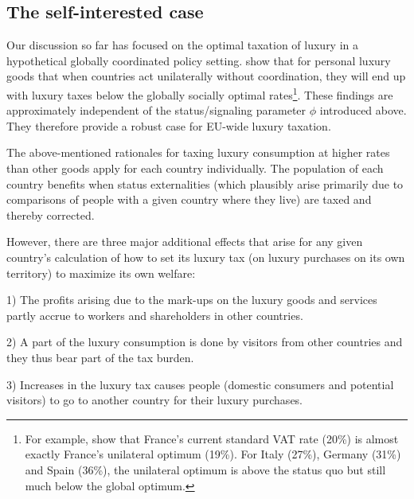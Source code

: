 \documentclass[../../main]{subfiles}
\begin{document}
\subsection{The self-interested case} %

Our discussion so far has focused on the optimal taxation of luxury in a hypothetical globally coordinated policy setting. %
\citet{Xie2026} show that for personal luxury goods that when countries act unilaterally without coordination, they will end up with luxury taxes below the globally socially optimal rates\footnote{For example, \citet{Xie2026} show that France's current standard VAT rate (20\%) is almost exactly France's unilateral optimum (19\%). For Italy (27\%), Germany (31\%) and Spain (36\%), the unilateral optimum is above the status quo but still much below the global optimum.}. %
These findings are approximately independent of the status/signaling parameter $\phi$ introduced above. They therefore provide a robust case for EU-wide luxury taxation.

The above-mentioned rationales for taxing luxury consumption at higher rates than other goods apply for each country individually. The population of each country benefits when status externalities (which plausibly arise primarily due to comparisons of people with a given country where they live) are taxed and thereby corrected.

However, there are three major additional effects that arise for any given country's calculation of how to set its luxury tax (on luxury purchases on its own territory) to maximize its own welfare:

1) The profits arising due to the mark-ups on the luxury goods and services partly accrue to workers and shareholders in other countries. %

2) A part of the luxury consumption is done by visitors from other countries and they thus bear part of the tax burden.

3) Increases in the luxury tax causes people (domestic consumers and potential visitors) to go to another country for their luxury purchases. %
\end{document}

